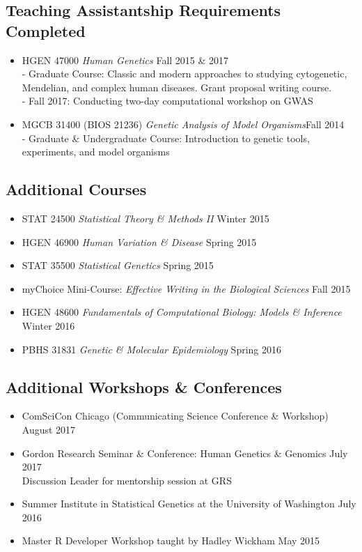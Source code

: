 \documentclass[a4paper, 11pt]{article}
\begin{document}
\subsection*{Teaching Assistantship Requirements Completed}
\begin{itemize}
	\item HGEN 47000 \emph{Human Genetics} \hfill Fall 2015 \& 2017\\
- Graduate Course: Classic and modern approaches to studying cytogenetic, Mendelian, and complex human diseases. Grant proposal writing course. \\ - Fall 2017: Conducting two-day computational workshop on GWAS
    \item MGCB 31400 (BIOS 21236) \emph{Genetic Analysis of Model Organisms}\hfill Fall 2014\\
- Graduate \& Undergraduate Course: Introduction to genetic tools, experiments, and model organisms 
\end{itemize}



\subsection*{Additional Courses}
\begin{itemize}
    \item STAT 24500 \emph{Statistical Theory \& Methods II }\hfill Winter 2015
    \item HGEN 46900 \emph{Human Variation \& Disease} \hfill Spring 2015
    \item STAT 35500 \emph{Statistical Genetics} \hfill Spring 2015
    \item myChoice Mini-Course: \emph{Effective Writing in the Biological Sciences} \hfill Fall 2015
    \item HGEN 48600 \emph{Fundamentals of Computational Biology: Models \& Inference} \hfill Winter 2016
    \item PBHS 31831 \emph{Genetic \& Molecular Epidemiology} \hfill Spring 2016
  
	
\end{itemize}

\subsection*{Additional Workshops \& Conferences}
\begin{itemize}
	\item ComSciCon Chicago (Communicating Science Conference \& Workshop)  \hfill August 2017
	\item Gordon Research Seminar \& Conference: Human Genetics \& Genomics \hfill July 2017 \\ Discussion Leader for mentorship session at GRS
     \item Summer Institute in Statistical Genetics at the University of Washington \hfill July 2016
        \item Master R Developer Workshop taught by Hadley Wickham \hfill May 2015
\end{itemize}
\end{document}
